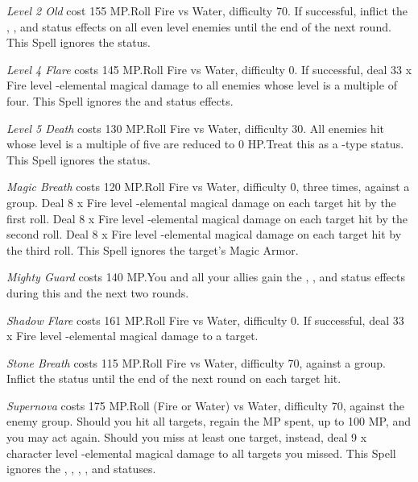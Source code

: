 \begin{multicols}{2}
    \textit{Level 2 Old} cost 155 MP.\@{}Roll Fire vs Water, difficulty 70. If successful, inflict the , ,  and  status effects on all even level enemies until the end of the next round. This Spell ignores the  status.
    
    \textit{Level 4 Flare} costs 145 MP.\@{}Roll Fire vs Water, difficulty 0. If successful, deal 33 x Fire level -elemental magical damage to all enemies whose level is a multiple of four. This Spell ignores the  and  status effects.
    
    \textit{Level 5 Death} costs 130 MP.\@{}Roll Fire vs Water, difficulty 30. All enemies hit whose level is a multiple of five are reduced to 0 HP.\@{}Treat this as a -type status. This Spell ignores the  status.
    
    \textit{Magic Breath} costs 120 MP.\@{}Roll Fire vs Water, difficulty 0, three times, against a group. Deal 8 x Fire level -elemental magical damage on each target hit by the first roll. Deal 8 x Fire level -elemental magical damage on each target hit by the second roll. Deal 8 x Fire level -elemental magical damage on each target hit by the third roll. This Spell ignores the target’s Magic Armor.
    
    \textit{Mighty Guard} costs 140 MP.\@{}You and all your allies gain the , , and  status effects during this and the next two rounds.
    
    \textit{Shadow Flare} costs 161 MP.\@{}Roll Fire vs Water, difficulty 0. If successful, deal 33 x Fire level -elemental magical damage to a target.
    
    \textit{Stone Breath} costs 115 MP.\@{}Roll Fire vs Water, difficulty 70, against a group. Inflict the  status until the end of the next round on each target hit.
    
	\textit{Supernova} costs 175 MP.\@{}Roll (Fire or Water) vs Water, difficulty 70, against the enemy group. Should you hit all targets, regain the MP spent, up to 100 MP, and you may act again. Should you miss at least one target, instead, deal 9 x character level -elemental magical damage to all targets you missed. This Spell ignores the , , , ,  and  statuses.

\end{multicols}
